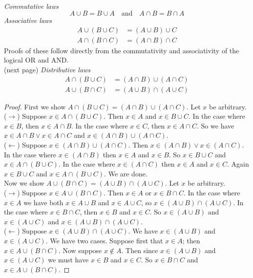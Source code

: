 \documentclass{report}
\begin{document}
\vspace{1mm}\\
\textit{Commutative laws}
\begin{equation*}
A\cup B=B\cup A\quad\text{and}\quad A\cap B=B\cap A
\end{equation*}
\textit{Associative laws}
\begin{align*}
A\cup(B\cup C)&=(A\cup B)\cup C\\
A\cap(B\cap C)&=(A\cap B)\cap C
\end{align*}
Proofs of these follow directly from the commutativity and associativity of the logical OR and AND.\\
(next page)\newpage
\noindent\textit{Distributive laws}
\begin{align*}
A\cap(B\cup C)&=(A\cap B)\cup(A\cap C)\\
A\cup(B\cap C)&=(A\cup B)\cap(A\cup C)
\end{align*}
\begin{proof}
First we show $A\cap(B\cup C)=(A\cap B)\cup(A\cap C)$. Let $x$ be arbitrary.\\
\indent($\rightarrow$) Suppose $x\in A\cap(B\cup C)$. Then $x\in A$ and $x\in B\cup C$. In the case where $x\in B$, then $x\in A\cap B$. In the case where $x\in C$, 
then $x\in A\cap C$. So we have $x\in A\cap B\lor x\in A\cap C$ and $x\in(A\cap B)\cup(A\cap C)$.\\
\indent($\leftarrow$) Suppose $x\in (A\cap B)\cup(A\cap C)$. Then $x\in (A\cap B)\lor x\in(A\cap C)$. In the case where $x\in (A\cap B)$ then $x\in A$ and $x\in B$. So $x\in B\cup C$ and 
$x\in A\cap(B\cup C)$. In the case where $x\in(A\cap C)$ then $x\in A$ and $x\in C$. Again $x\in B\cup C$ and $x\in A\cap(B\cup C)$. We are done.\\
\indent Now we show $A\cup(B\cap C)=(A\cup B)\cap(A\cup C)$. Let $x$ be arbitrary.\\
\indent($\rightarrow$) Suppose $x\in A\cup(B\cap C)$. Then $x\in A$ or $x\in B\cap C$. In the case where $x\in A$ we have both $x\in A\cup B$ and $x\in A\cup C$, so $x\in(A\cup B)\cap(A\cup C)$. 
In the case where $x\in B\cap C$, then $x\in B$ and $x\in C$. So $x\in(A\cup B)$ and $x\in(A\cup C)$ and $x\in(A\cup B)\cap(A\cup C)$.\\
\indent($\leftarrow$) Suppose $x\in(A\cup B)\cap(A\cup C)$. We have $x\in(A\cup B)$ and $x\in(A\cup C)$. We have two cases. Suppose first that $x\in A$; then $x\in A\cup(B\cap C)$. 
Now suppose $x\notin A$. Then since $x\in(A\cup B)$ and $x\in(A\cup C)$ we must have $x\in B$ and $x\in C$. So $x\in B\cap C$ and $x\in A\cup(B\cap C)$.
\end{proof}
\end{document}
